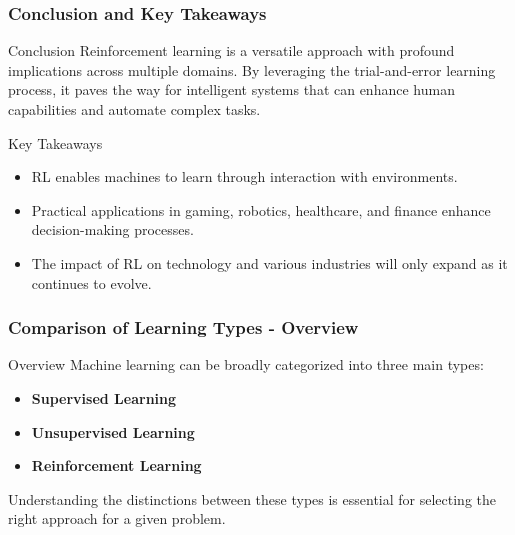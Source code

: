 \documentclass[aspectratio=169]{beamer}
\begin{document}
\begin{frame}[fragile]
    \frametitle{Conclusion and Key Takeaways}
    \begin{block}{Conclusion}
        Reinforcement learning is a versatile approach with profound implications across multiple domains. By leveraging the trial-and-error learning process, it paves the way for intelligent systems that can enhance human capabilities and automate complex tasks.
    \end{block}

    \begin{block}{Key Takeaways}
        \begin{itemize}
            \item RL enables machines to learn through interaction with environments.
            \item Practical applications in gaming, robotics, healthcare, and finance enhance decision-making processes.
            \item The impact of RL on technology and various industries will only expand as it continues to evolve.
        \end{itemize}
    \end{block}
\end{frame}

\begin{frame}[fragile]
    \frametitle{Comparison of Learning Types - Overview}
    \begin{block}{Overview}
        Machine learning can be broadly categorized into three main types:
        \begin{itemize}
            \item \textbf{Supervised Learning}
            \item \textbf{Unsupervised Learning}
            \item \textbf{Reinforcement Learning}
        \end{itemize}
        Understanding the distinctions between these types is essential for selecting the right approach for a given problem.
    \end{block}
\end{frame}
\end{document}
